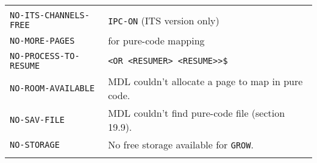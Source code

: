 \documentclass[a4paper,]{article}
\begin{document}
\begin{longtable}[]{@{}ll@{}}
\begin{minipage}[t]{0.36\columnwidth}
\end{minipage}\tabularnewline
\begin{minipage}[t]{0.58\columnwidth}\raggedright\strut
\texttt{NO-ITS-CHANNELS-FREE}\strut
\end{minipage} & \begin{minipage}[t]{0.36\columnwidth}\raggedright\strut
\texttt{IPC-ON} (ITS version only)\strut
\end{minipage}\tabularnewline
\begin{minipage}[t]{0.58\columnwidth}\raggedright\strut
\texttt{NO-MORE-PAGES}\strut
\end{minipage} & \begin{minipage}[t]{0.36\columnwidth}\raggedright\strut
for pure-code mapping\strut
\end{minipage}\tabularnewline
\begin{minipage}[t]{0.58\columnwidth}\raggedright\strut
\texttt{NO-PROCESS-TO-RESUME}\strut
\end{minipage} & \begin{minipage}[t]{0.36\columnwidth}\raggedright\strut
\texttt{\textless{}OR\ \textless{}RESUMER\textgreater{}\ \textless{}RESUME\textgreater{}\textgreater{}\$}\strut
\end{minipage}\tabularnewline
\begin{minipage}[t]{0.58\columnwidth}\raggedright\strut
\texttt{NO-ROOM-AVAILABLE}\strut
\end{minipage} & \begin{minipage}[t]{0.36\columnwidth}\raggedright\strut
MDL couldn't allocate a page to map in pure code.\strut
\end{minipage}\tabularnewline
\begin{minipage}[t]{0.58\columnwidth}\raggedright\strut
\texttt{NO-SAV-FILE}\strut
\end{minipage} & \begin{minipage}[t]{0.36\columnwidth}\raggedright\strut
MDL couldn't find pure-code file (section 19.9).\strut
\end{minipage}\tabularnewline
\begin{minipage}[t]{0.58\columnwidth}\raggedright\strut
\texttt{NO-STORAGE}\strut
\end{minipage} & \begin{minipage}[t]{0.36\columnwidth}\raggedright\strut
No free storage available for \texttt{GROW}.\strut
\end{minipage}\tabularnewline
\begin{minipage}[t]{0.58\columnwidth}\raggedright\strut

\end{minipage}
\end{longtable}
\end{document}
